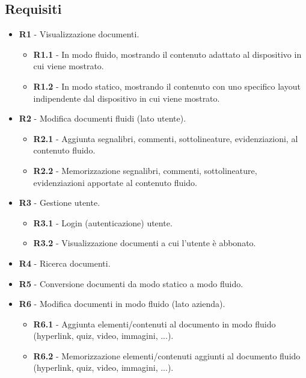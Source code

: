 \subsection{Requisiti}
\begin{itemize}
    \item \textbf{R1} - Visualizzazione documenti.
    \begin{itemize}
        \item \textbf{R1.1} - In modo fluido, mostrando il contenuto adattato al dispositivo in cui viene mostrato.
        
        \item \textbf{R1.2} - In modo statico, mostrando il contenuto con uno specifico layout indipendente dal dispositivo in cui viene mostrato.
    \end{itemize}
    
    \item \textbf{R2} - Modifica documenti fluidi (lato utente).
    \begin{itemize}
        \item \textbf{R2.1} - Aggiunta segnalibri, commenti, sottolineature, evidenziazioni, al contenuto fluido.
        
        \item \textbf{R2.2} - Memorizzazione segnalibri, commenti, sottolineature, evidenziazioni apportate al contenuto fluido.
    \end{itemize}
    
    \item \textbf{R3} - Gestione utente.
    \begin{itemize}
        \item \textbf{R3.1} - Login (autenticazione) utente.
        
        \item \textbf{R3.2} - Visualizzazione documenti a cui l'utente è abbonato.
    \end{itemize}
    
    \item \textbf{R4} - Ricerca documenti.
    
    \item \textbf{R5} - Conversione documenti da modo statico a modo fluido.
    
    \item \textbf{R6} - Modifica documenti in modo fluido (lato azienda).
    \begin{itemize}
        \item \textbf{R6.1} - Aggiunta elementi/contenuti al documento in modo fluido (hyperlink, quiz, video, immagini, ...).
        
        \item \textbf{R6.2} - Memorizzazione elementi/contenuti aggiunti al documento fluido (hyperlink, quiz, video, immagini, ...).
    \end{itemize}
\end{itemize}